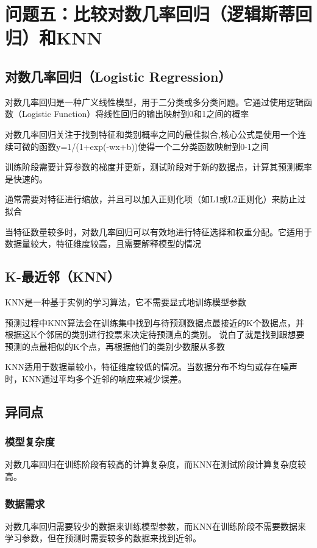 \documentclass[10pt]{article}
\begin{document}
	
	
	
	
	\section{问题五：比较对数几率回归（逻辑斯蒂回归）和KNN}
	\subsection{对数几率回归（Logistic Regression）}
	对数几率回归是一种广义线性模型，用于二分类或多分类问题。它通过使用逻辑函数（Logistic Function）将线性回归的输出映射到0和1之间的概率\par
	对数几率回归关注于找到特征和类别概率之间的最佳拟合,核心公式是使用一个连续可微的函数y=1/(1+exp(-wx+b))使得一个二分类函数映射到0-1之间\par
	训练阶段需要计算参数的梯度并更新，测试阶段对于新的数据点，计算其预测概率是快速的。\par
通常需要对特征进行缩放，并且可以加入正则化项（如L1或L2正则化）来防止过拟合\par
	当特征数量较多时，对数几率回归可以有效地进行特征选择和权重分配。它适用于数据量较大，特征维度较高，且需要解释模型的情况\par
	
	\subsection{K-最近邻（KNN）}
	KNN是一种基于实例的学习算法，它不需要显式地训练模型参数\par
	预测过程中KNN算法会在训练集中找到与待预测数据点最接近的K个数据点，并根据这K个邻居的类别进行投票来决定待预测点的类别。
	说白了就是找到跟想要预测的点最相似的K个点，再根据他们的类别少数服从多数\par
KNN适用于数据量较小，特征维度较低的情况。当数据分布不均匀或存在噪声时，KNN通过平均多个近邻的响应来减少误差。\par
	
	\subsection{异同点}
	\subsubsection{模型复杂度}对数几率回归在训练阶段有较高的计算复杂度，而KNN在测试阶段计算复杂度较高。
	\subsubsection{数据需求}对数几率回归需要较少的数据来训练模型参数，而KNN在训练阶段不需要数据来学习参数，但在预测时需要较多的数据来找到近邻。
\end{document}
